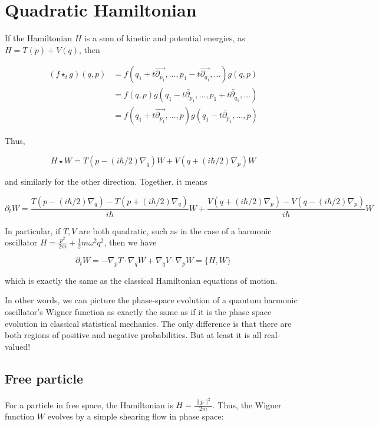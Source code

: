 \section{Quadratic Hamiltonian}

If the Hamiltonian $H$ is a sum of kinetic and potential energies, as
$H = T(p) + V(q)$, then

$$
\begin{aligned}
  (f \star_t g)(q,p) &= f\left(q_1 + t\overrightarrow{\partial_{p_1}}, \dots, p_1 - t\overrightarrow{\partial_{q_1}}, \dots\right) g(q,p) \\
  &= f(q,p) g\left(q_1 - t\overleftarrow{\partial_{p_1}}, \dots, p_1 + t\overleftarrow{\partial_{q_1}}, \dots\right) \\
  &= f\left(q_1 + t\overrightarrow{\partial_{p_1}}, \dots, p\right) g\left(q_1 - t\overleftarrow{\partial_{p_1}}, \dots, p\right)
  \end{aligned}
$$

Thus,

$$
H \star W = T(p - (i\hbar/2)\nabla_q) W + V(q +  (i\hbar/2) \nabla_p) W
$$

and similarly for the other direction. Together, it means

$$
\partial_t W = \frac{T(p - (i\hbar/2)\nabla_q) - T(p + (i\hbar/2)\nabla_q)}{i\hbar} W + \frac{V(q + (i\hbar/2)\nabla_p) - V(q - (i\hbar/2)\nabla_p)}{i\hbar} W
$$

In particular, if $T, V$ are both quadratic, such as in the case of a
harmonic oscillator $H = \frac{p^2}{2m} + \frac 12 m\omega^2 q^2$,
then we have

$$
\partial_t W = -\nabla_p T \cdot \nabla_q W + \nabla_q V \cdot \nabla_p W = \{H, W\}
$$

which is exactly the same as the classical Hamiltonian equations of
motion.

In other words, we can picture the phase-space evolution of a quantum
harmonic oscillator's Wigner function as exactly the same as if it is
the phase space evolution in classical statistical mechanics. The only
difference is that there are both regions of positive and negative
probabilities. But at least it is all real-valued!

\subsection{Free particle}

For a particle in free space, the Hamiltonian is
$H = \frac{\|p\|^2}{2m}$. Thus, the Wigner function $W$ evolves by a
simple shearing flow in phase space:

